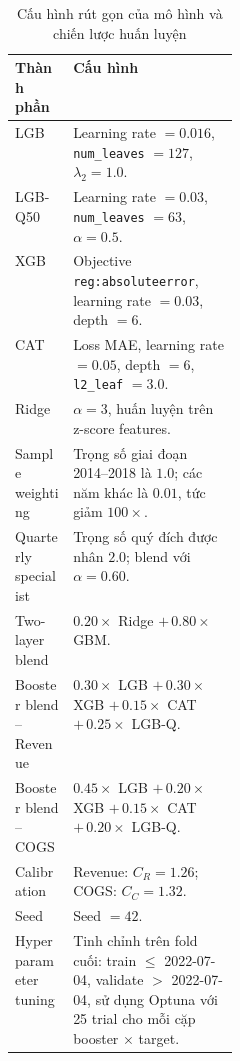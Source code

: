 \documentclass{article}
\begin{document}
\begin{table}[H]
\centering
\caption{Cấu hình rút gọn của mô hình và chiến lược huấn luyện}
\label{tab:model_config_summary}
\renewcommand{\arraystretch}{1.25}
\begin{tabularx}{\linewidth}{p{0.26\linewidth} X}
\hline
\textbf{Thành phần} & \textbf{Cấu hình} \\
\hline

LGB 
& Learning rate $=0.016$, \texttt{num\_leaves} $=127$, $\lambda_2 = 1.0$. \\

LGB-Q50 
& Learning rate $=0.03$, \texttt{num\_leaves} $=63$, $\alpha=0.5$. \\

XGB 
& Objective \texttt{reg:absoluteerror}, learning rate $=0.03$, depth $=6$. \\

CAT 
& Loss MAE, learning rate $=0.05$, depth $=6$, \texttt{l2\_leaf} $=3.0$. \\

Ridge 
& $\alpha=3$, huấn luyện trên z-score features. \\

Sample weighting 
& Trọng số giai đoạn 2014--2018 là $1.0$; các năm khác là $0.01$, tức giảm $100\times$. \\

Quarterly specialist 
& Trọng số quý đích được nhân $2.0$; blend với $\alpha=0.60$. \\

Two-layer blend 
& $0.20 \times$ Ridge $+\,0.80 \times$ GBM. \\

Booster blend -- Revenue 
& $0.30 \times$ LGB $+\,0.30 \times$ XGB $+\,0.15 \times$ CAT $+\,0.25 \times$ LGB-Q. \\

Booster blend -- COGS 
& $0.45 \times$ LGB $+\,0.20 \times$ XGB $+\,0.15 \times$ CAT $+\,0.20 \times$ LGB-Q. \\

Calibration 
& Revenue: $C_R=1.26$; COGS: $C_C=1.32$. \\

Seed 
& Seed $=42$. \\

Hyperparameter tuning 
& Tinh chỉnh trên fold cuối: train $\leq$ 2022-07-04, validate $>$ 2022-07-04, sử dụng Optuna với 25 trial cho mỗi cặp booster $\times$ target. \\

\hline
\end{tabularx}
\end{table}
\end{document}
